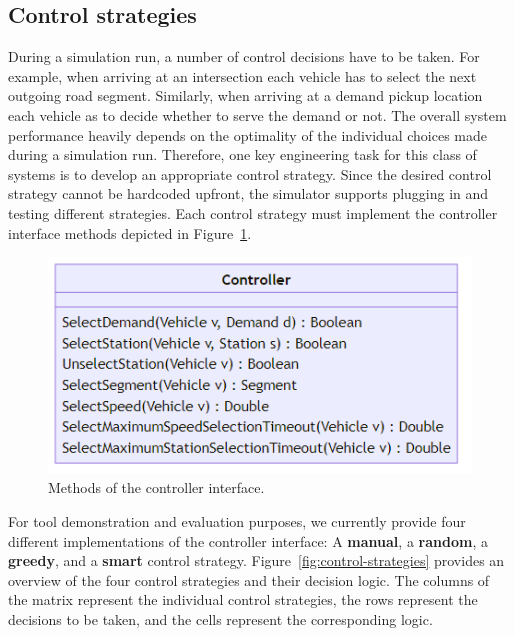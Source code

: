 \documentclass[10pt,twocolumn]{article}
\begin{document}
\subsection{Control strategies}
\label{sec:controller-interface}


During a simulation run, a number of control decisions have to be taken.
For example, when arriving at an intersection each vehicle has to select the next outgoing road segment.
Similarly, when arriving at a demand pickup location each vehicle as to decide whether to serve the demand or not.
The overall system performance heavily depends on the optimality of the individual choices made during a simulation run.
Therefore, one key engineering task for this class of systems is to develop an appropriate control strategy.
Since the desired control strategy cannot be hardcoded upfront, the simulator supports plugging in and testing different strategies.
Each control strategy must implement the controller interface methods depicted in Figure~\ref{fig:controller-interface}.

\begin{figure}[!ht]
    \centering
    \includegraphics[scale=0.4]{../../diagrams/controller/classes-minimal.png}
    \caption{Methods of the controller interface.}
    \label{fig:controller-interface}
\end{figure}

For tool demonstration and evaluation purposes, we currently provide four different implementations of the controller interface: A \textbf{manual}, a \textbf{random}, a \textbf{greedy}, and a \textbf{smart} control strategy.
Figure~\ref{fig:control-strategies} provides an overview of the four control strategies and their decision logic.
The columns of the matrix represent the individual control strategies, the rows represent the decisions to be taken, and the cells represent the corresponding logic.
\end{document}
